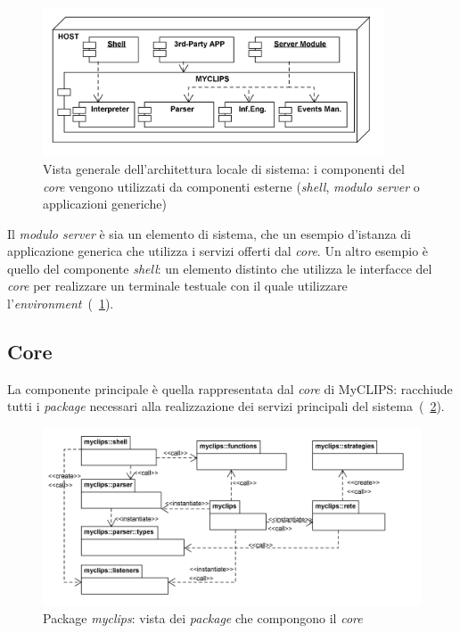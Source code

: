 \begin{figure}[h]
\centering
\includegraphics[width=0.9\textwidth]{Immagini/Capitolo3/Deployment/Shell-3rdPartyApp.png}
\caption[Vista generale dell'architettura locale di sistema]{Vista generale dell'architettura locale di sistema: i componenti del \emph{core} vengono utilizzati da componenti esterne (\emph{shell}, \emph{modulo server} o applicazioni generiche)}\label{fig:architettura-3rdparty}
\end{figure}

Il \emph{modulo server} è sia un elemento di sistema, che un esempio d'istanza di applicazione generica che utilizza i servizi offerti dal \emph{core}. Un altro esempio è quello del componente \emph{shell}: un elemento distinto che utilizza le interfacce del \emph{core} per realizzare un terminale testuale con il quale utilizzare l'\emph{environment}~(\figurename~\ref{fig:architettura-3rdparty}).


\subsection{Core}

La componente principale è quella rappresentata dal \emph{core} di MyCLIPS: racchiude tutti i \emph{package} necessari alla realizzazione dei servizi principali del sistema~(\figurename~\ref{fig:packages-myclips}).

\begin{figure}[h]
\centering
\includegraphics[width=1\textwidth]{Immagini/Capitolo3/Packages/Core.png}
\caption{Package \emph{myclips}: vista dei \emph{package} che compongono il \emph{core}}\label{fig:packages-myclips}
\end{figure}

